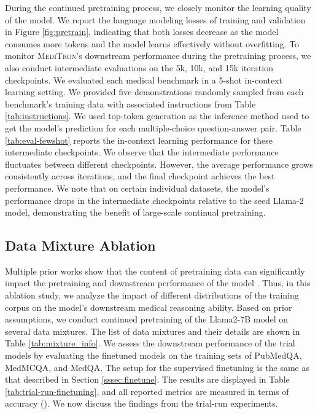 \documentclass{article}
\newcommand{\llama}{\textnormal{Llama}}
\newcommand{\mtron}{\textsc{MediTron}\xspace}
\begin{document}
During the continued pretraining process, we closely monitor the learning quality of the model.
We report the language modeling losses of training and validation in Figure \ref{fig:pretrain}, indicating that both losses decrease as the model consumes more tokens and the model learns effectively without overfitting. 
To monitor \mtron's downstream performance during the pretraining process, we also conduct intermediate evaluations on the 5k, 10k, and 15k iteration checkpoints. 
We evaluated each medical benchmark in a 5-shot in-context learning setting. 
We provided five demonstrations randomly sampled from each benchmark's training data with associated instructions from Table \ref{tab:instructions}. 
We used top-token generation as the inference method used to get the model's prediction for each multiple-choice question-answer pair.
Table \ref{tab:eval-fewshot} reports the in-context learning performance for these intermediate checkpoints.
We observe that the intermediate performance fluctuates between different checkpoints. However, the average performance grows consistently across iterations, and the final checkpoint achieves the best performance. We note that on certain individual datasets, the model's performance drops in the intermediate checkpoints relative to the seed \llama-2 model, demonstrating the benefit of large-scale continual pretraining.

 \subsection{Data Mixture Ablation} \label{sec:7-trail-runs}

Multiple prior works show that the content of pretraining data can significantly impact the pretraining and downstream performance of the model \citep{xie2023doremi, glam, penedo2023refinedweb, longpre2023pretrainers}. Thus, in this ablation study, we analyze the impact of different distributions of the training corpus on the model's downstream medical reasoning ability. Based on prior assumptions, we conduct continued pretraining of the \llama2-7B model on several data mixtures. The list of data mixtures and their details are shown in Table \ref{tab:mixture_info}. We assess the downstream performance of the trial models by evaluating the finetuned models on the training sets of PubMedQA, MedMCQA, and MedQA. The setup for the supervised finetuning is the same as that described in Section \ref{sssec:finetune}. The results are displayed in Table \ref{tab:trial-run-finetuning}, and all reported metrics are measured in terms of accuracy (). We now discuss the findings from the trial-run experiments.
\end{document}
